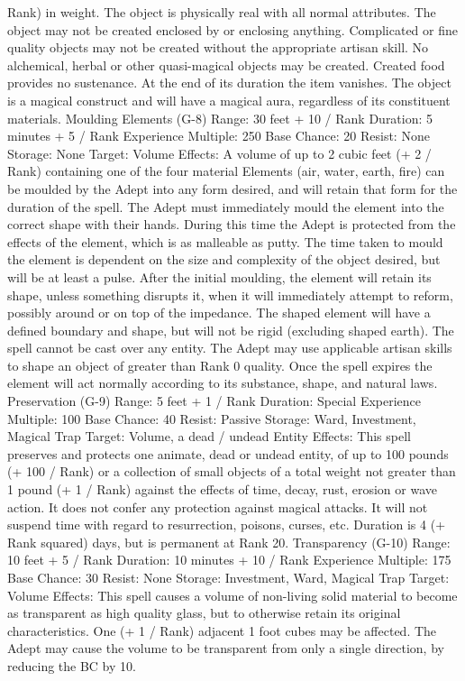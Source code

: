 \documentclass[a4paper]{article}
\begin{document}
\begin{multicols}{3}
Rank) in weight. The object is physically real with
all normal attributes. The object may not be created
enclosed by or enclosing anything. Complicated or
fine quality objects may not be created without the
appropriate artisan skill. No alchemical, herbal or
other quasi-magical objects may be created. Created food provides no sustenance. At the end of its
duration the item vanishes. The object is a magical
construct and will have a magical aura, regardless
of its constituent materials.
Moulding Elements (G-8)
Range: 30 feet + 10 / Rank
Duration: 5 minutes + 5 / Rank
Experience Multiple: 250
Base Chance: 20%
Resist: None
Storage: None
Target: Volume
Effects: A volume of up to 2 cubic feet (+ 2 /
Rank) containing one of the four material Elements
(air, water, earth, fire) can be moulded by the
Adept into any form desired, and will retain that
form for the duration of the spell. The Adept must
immediately mould the element into the correct
shape with their hands. During this time the Adept
is protected from the effects of the element, which
is as malleable as putty. The time taken to mould
the element is dependent on the size and complexity of the object desired, but will be at least a pulse.
After the initial moulding, the element will retain
its shape, unless something disrupts it, when it will
immediately attempt to reform, possibly around or
on top of the impedance. The shaped element will
have a defined boundary and shape, but will not be
rigid (excluding shaped earth). The spell cannot be
cast over any entity. The Adept may use applicable
artisan skills to shape an object of greater than
Rank 0 quality. Once the spell expires the element
will act normally according to its substance, shape,
and natural laws.
Preservation (G-9)
Range: 5 feet + 1 / Rank
Duration: Special
Experience Multiple: 100
Base Chance: 40%
Resist: Passive
Storage: Ward, Investment, Magical Trap
Target: Volume, a dead / undead Entity
Effects: This spell preserves and protects one animate, dead or undead entity, of up to 100 pounds
(+ 100 / Rank) or a collection of small objects of a
total weight not greater than 1 pound (+ 1 / Rank)
against the effects of time, decay, rust, erosion or
wave action. It does not confer any protection
against magical attacks. It will not suspend time
with regard to resurrection, poisons, curses, etc.
Duration is 4 (+ Rank squared) days, but is permanent at Rank 20.
Transparency (G-10)
Range: 10 feet + 5 / Rank
Duration: 10 minutes + 10 / Rank
Experience Multiple: 175
Base Chance: 30%
Resist: None
Storage: Investment, Ward, Magical Trap
Target: Volume
Effects: This spell causes a volume of non-living
solid material to become as transparent as high
quality glass, but to otherwise retain its original
characteristics. One (+ 1 / Rank) adjacent 1 foot
cubes may be affected. The Adept may cause the
volume to be transparent from only a single direction, by reducing the BC by 10.


\end{multicols}
\end{document}
